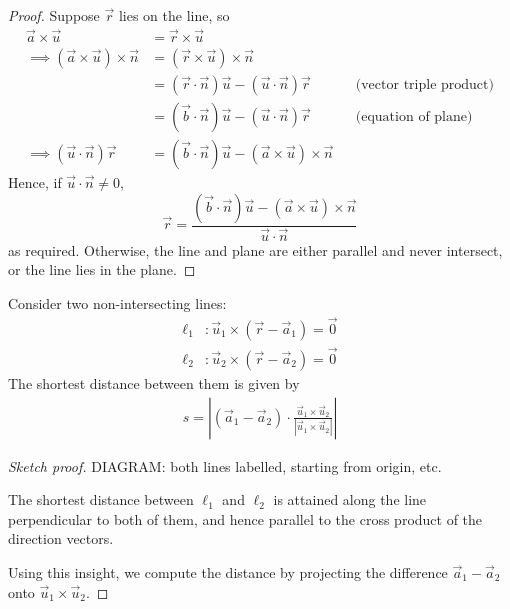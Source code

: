 \documentclass{../../template/note}
\begin{document}
    \begin{proof}
        Suppose \(\vec r\) lies on the line, so
        \begin{align*}
            \vec a \times \vec u &= \vec r \times \vec u \\
            \implies (\vec a \times \vec u) \times \vec n &= (\vec r \times \vec u) \times \vec n \\
            &= (\vec r \cdot \vec n) \vec u - (\vec u \cdot \vec n) \vec r && \text{(vector triple product)} \\
            &= (\vec b \cdot \vec n) \vec u - (\vec u \cdot \vec n) \vec r && \text{(equation of plane)} \\
            \implies (\vec u \cdot \vec n) \vec r &= (\vec b \cdot \vec n) \vec u - (\vec a \times \vec u) \times \vec n
        \end{align*}
        Hence, if \(\vec u \cdot \vec n \neq 0\),
        \[
            \vec r = \frac{(\vec b \cdot \vec n)\vec u - (\vec a \times \vec u) \times \vec n}{\vec u \cdot \vec n}
        \]
        as required. Otherwise, the line and plane are either parallel and never intersect, or the line lies in the plane.
        
    \end{proof}
    
    
    


    \begin{proposition}
        Consider two non-intersecting lines:
        \begin{align*}
            \ell_1 &: \vec u_1 \times (\vec r - \vec a_1) = \vec 0 \\
            \ell_2 &: \vec u_2 \times (\vec r - \vec a_2) = \vec 0
        \end{align*}
        The shortest distance between them is given by
        \begin{align*}
            s = \left|(\vec a_1 - \vec a_2) \cdot \frac{\vec u_1 \times \vec u_2}{|\vec u_1 \times \vec u_2|}\right|
        \end{align*}
    \end{proposition}
    
    \begin{proof}[Sketch proof]
        DIAGRAM: both lines labelled, starting from origin, etc.

        The shortest distance between \(\ell_1\) and \(\ell_2\) is attained along the line perpendicular to both of them, and hence parallel to the cross product of the direction vectors.

        Using this insight, we compute the distance by projecting the difference \(\vec a_1 - \vec a_2\) onto \(\vec u_1 \times \vec u_2\).
    \end{proof}
    
\end{document}
